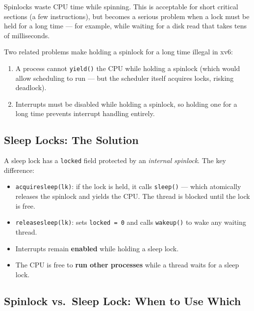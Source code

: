 \documentclass[11pt, a4paper]{article}
\begin{document}
Spinlocks waste CPU time while spinning. This is acceptable for short critical sections (a few instructions), but becomes a serious problem when a lock must be held for a long time --- for example, while waiting for a disk read that takes tens of milliseconds.

Two related problems make holding a spinlock for a long time illegal in xv6:
\begin{enumerate}[leftmargin=2em]
  \item A process cannot \lstinline|yield()| the CPU while holding a spinlock (which would allow scheduling to run --- but the scheduler itself acquires locks, risking deadlock).
  \item Interrupts must be disabled while holding a spinlock, so holding one for a long time prevents interrupt handling entirely.
\end{enumerate}

\subsection{Sleep Locks: The Solution}

\begin{tcolorbox}[sleeplock, title={Sleep Lock Design (kernel/sleeplock.c:22)}]
A sleep lock has a \lstinline|locked| field protected by an \emph{internal spinlock}. The key difference:

\begin{itemize}[leftmargin=1.5em, itemsep=0.25em]
  \item \lstinline|acquiresleep(lk)|: if the lock is held, it calls \lstinline|sleep()| --- which atomically releases the spinlock and yields the CPU. The thread is blocked until the lock is free.
  \item \lstinline|releasesleep(lk)|: sets \lstinline|locked = 0| and calls \lstinline|wakeup()| to wake any waiting thread.
  \item Interrupts remain \textbf{enabled} while holding a sleep lock.
  \item The CPU is free to \textbf{run other processes} while a thread waits for a sleep lock.
\end{itemize}
\end{tcolorbox}

\subsection{Spinlock vs.\ Sleep Lock: When to Use Which}
\end{document}
